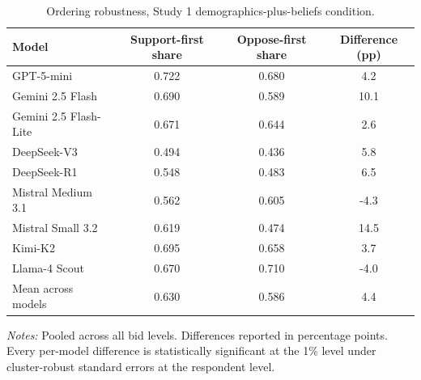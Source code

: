 
\begin{table}[h]
    \centering
    \caption{Ordering robustness, Study 1 demographics-plus-beliefs condition.}
    \begin{threeparttable}
    \begin{tabular}{lccc}
        \toprule
        Model & Support-first share & Oppose-first share & Difference (pp) \\
        \midrule
        GPT-5-mini             & 0.722 & 0.680 & 4.2 \\
        Gemini 2.5 Flash       & 0.690 & 0.589 & 10.1 \\
        Gemini 2.5 Flash-Lite  & 0.671 & 0.644 & 2.6 \\
        DeepSeek-V3            & 0.494 & 0.436 & 5.8 \\
        DeepSeek-R1            & 0.548 & 0.483 & 6.5 \\
        Mistral Medium 3.1     & 0.562 & 0.605 & -4.3 \\
        Mistral Small 3.2      & 0.619 & 0.474 & 14.5 \\
        Kimi-K2                & 0.695 & 0.658 & 3.7 \\
        Llama-4 Scout          & 0.670 & 0.710 & -4.0 \\
        \midrule
        Mean across models     & 0.630 & 0.586 & 4.4      \\
        \bottomrule
    \end{tabular}
    \begin{tablenotes}\footnotesize
        \item \textit{Notes:} Pooled across all bid levels. Differences reported in percentage points. Every per-model difference is statistically significant at the 1\% level under cluster-robust standard errors at the respondent level.
    \end{tablenotes}
    \end{threeparttable}
\end{table}